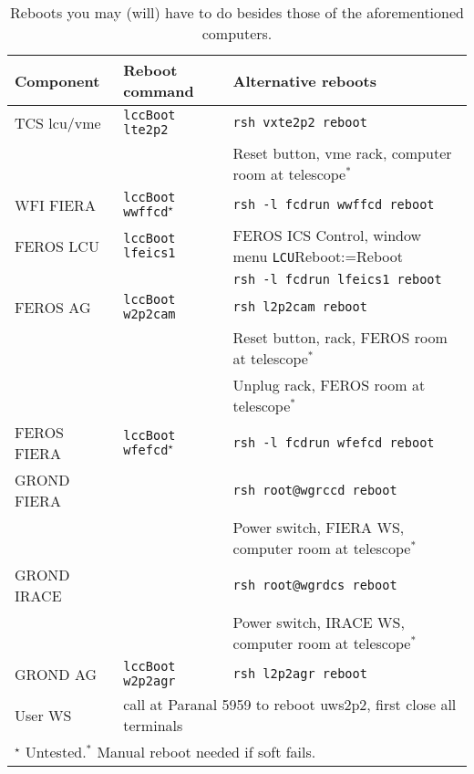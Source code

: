 \documentclass[11pt,fleqn,a4paper]{book}
\makeatletter
\def\menu#1#2{\texttt{#1}\ifx{}#2\else\@for\@x:=#2\do{$\rightarrow$\texttt{\@x}}\fi}
\def\wmenu#1#2{window menu \menu{#1}{#2}}
\makeatother
\begin{document}
\begin{table}
\caption[Some useful reboots]{Reboots you may (will) have to do besides those of the aforementioned computers.}
\label{tab:reboots}
\centering
\begin{tabular}{lll}
\hline
Component   & Reboot command                       & Alternative reboots\\
\hline\hline
TCS \gls{lcu}/\gls{vme} & \texttt{\gls{lccBoot} \gls{lte2p2}}  & \texttt{rsh vxte2p2 reboot}\\ 
            &                                      & Reset button, \gls{vme} rack, \gls{computer room} at telescope$^\ast$\\
\hline
WFI FIERA   & \texttt{\gls{lccBoot} \gls{wwffcd}}$^\star$& \texttt{rsh -l fcdrun wwffcd reboot}\\
\hline
FEROS LCU   & \texttt{\gls{lccBoot} \gls{lfeics1}}       & FEROS \gls{ICS Control}, \wmenu{LCU}{Reboot}\\
            &                                      & \texttt{rsh -l fcdrun lfeics1 reboot}\\
FEROS AG    & \texttt{\gls{lccBoot} \gls{w2p2cam}}             & \texttt{rsh \gls{l2p2cam} reboot}\\
            &                                      & Reset button, rack, FEROS room at telescope$^\ast$\\
            &                                      & Unplug rack, FEROS room at telescope$^\ast$\\
FEROS FIERA & \texttt{\gls{lccBoot} \gls{wfefcd}}$^\star$& \texttt{rsh -l fcdrun wfefcd reboot}\\
\hline
GROND FIERA &                                      & \texttt{rsh root@\gls{wgrccd} reboot}\\
            &                                      & Power switch, FIERA WS, \gls{computer room} at telescope$^\ast$\\
GROND IRACE &                                      & \texttt{rsh root@wgrdcs reboot}\\
            &                                      & Power switch, IRACE WS, computer room at telescope$^\ast$\\
GROND AG    & \texttt{\gls{lccBoot} \gls{w2p2agr}}             & \texttt{rsh \gls{l2p2agr} reboot}\\
\hline
User WS     & \multicolumn{2}{l}{call at Paranal 5959 to reboot \gls{uws2p2}, first close all terminals}\\
\hline
\multicolumn{3}{l}{$^\star$ Untested.\quad $^\ast$ Manual reboot needed if soft fails.}\\
\hline
\end{tabular}
\end{table}

\printglossaries
{}
\end{document}
